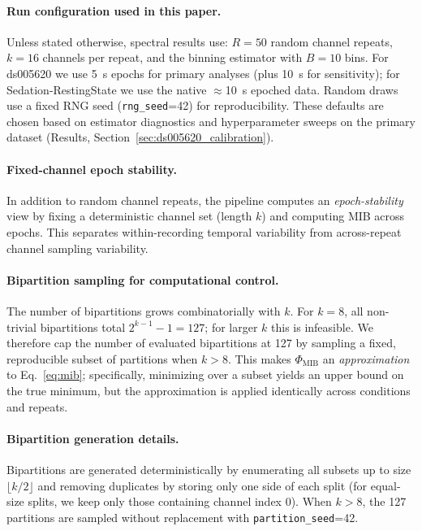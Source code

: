 \documentclass[11pt]{article}
\begin{document}
\paragraph{Run configuration used in this paper.}
Unless stated otherwise, spectral results use:
$R=50$ random channel repeats,
$k=16$ channels per repeat,
and the binning estimator with $B=10$ bins.
For ds005620 we use \SI{5}{s} epochs for primary analyses (plus \SI{10}{s} for sensitivity);
for Sedation-RestingState we use the native $\approx$\SI{10}{s} epoched data.
Random draws use a fixed RNG seed (\texttt{rng\_seed}=42) for reproducibility.
These defaults are chosen based on estimator diagnostics and hyperparameter sweeps on the primary dataset (Results, Section~\ref{sec:ds005620_calibration}).

\paragraph{Fixed-channel epoch stability.}
In addition to random channel repeats, the pipeline computes an \emph{epoch-stability} view by fixing a deterministic channel set (length $k$) and computing MIB across epochs. This separates within-recording temporal variability from across-repeat channel sampling variability.

\paragraph{Bipartition sampling for computational control.}
The number of bipartitions grows combinatorially with $k$. For $k=8$, all non-trivial bipartitions total $2^{k-1}-1=127$; for larger $k$ this is infeasible. We therefore cap the number of evaluated bipartitions at 127 by sampling a fixed, reproducible subset of partitions when $k>8$. This makes $\Phi_{\mathrm{MIB}}$ an \emph{approximation} to Eq.~\eqref{eq:mib}; specifically, minimizing over a subset yields an upper bound on the true minimum, but the approximation is applied identically across conditions and repeats.

\paragraph{Bipartition generation details.}
Bipartitions are generated deterministically by enumerating all subsets up to size $\lfloor k/2 \rfloor$ and removing duplicates by storing only one side of each split (for equal-size splits, we keep only those containing channel index 0). When $k>8$, the 127 partitions are sampled without replacement with \texttt{partition\_seed}=42.
\end{document}
